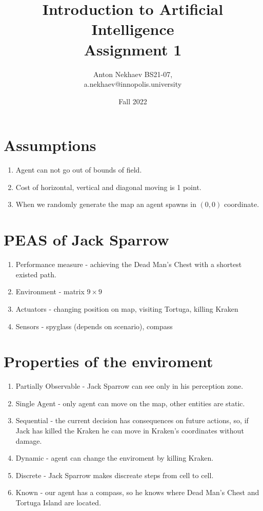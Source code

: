 \documentclass[a4paper]{article}
\title{Introduction to Artificial Intelligence \\ Assignment 1}
\author{Anton Nekhaev BS21-07, \\ a.nekhaev@innopolis.university}
\date{Fall 2022}
\begin{document}
\maketitle

\section{Assumptions}
\begin{enumerate}
  \item Agent can not go out of bounds of field.
  \item Cost of horizontal, vertical and diagonal moving is 1 point. 
  \item When we randomly generate the map an agent spawns in $(0, 0)$ coordinate.
\end{enumerate}

\section{PEAS of Jack Sparrow}
\begin{enumerate}
    \item[] Performance measure - achieving the Dead Man’s Chest with a shortest existed path. 
    \item[] Environment - matrix $9 \times 9$
    \item[] Actuators - changing position on map, visiting Tortuga, killing Kraken
    \item[] Sensors - spyglass (depends on scenario), compass
\end{enumerate}

\section{Properties of the enviroment}
\begin{enumerate}
    \item[] Partially Observable - Jack Sparrow can see only in his perception zone.
    \item[] Single Agent - only agent can move on the map, other entities are static.
    \item[] Sequential - the current decision has consequences on future actions, so, if Jack has killed the Kraken he can move in Kraken's coordinates without damage.
    \item[] Dynamic - agent can change the enviroment by killing Kraken.
    \item[] Discrete - Jack Sparrow makes discreate steps from cell to cell.
    \item[] Known - our agent has a compass, so he knows where Dead Man's Chest and Tortuga Island are located.
\end{enumerate}
\end{document}
